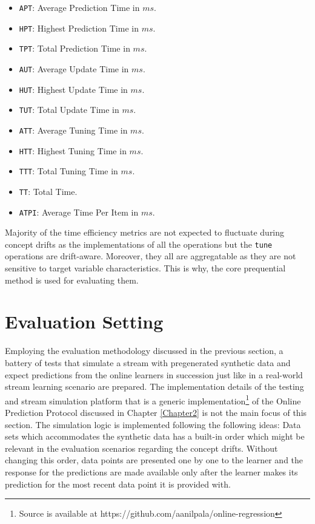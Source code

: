 \begin{itemize}
\item \texttt{APT}: Average Prediction Time in $ms$.
\item \texttt{HPT}: Highest Prediction Time in $ms$.
\item \texttt{TPT}: Total Prediction Time in $ms$.
\item \texttt{AUT}: Average Update Time in $ms$.
\item \texttt{HUT}: Highest Update Time in $ms$.
\item \texttt{TUT}: Total Update Time in $ms$.
\item \texttt{ATT}: Average Tuning Time in $ms$.
\item \texttt{HTT}: Highest Tuning Time in $ms$.
\item \texttt{TTT}: Total Tuning Time in $ms$.
\item \texttt{TT}: Total Time.
\item \texttt{ATPI}: Average Time Per Item in $ms$.
\end{itemize}

Majority of the time efficiency metrics are not expected to fluctuate during concept drifts as the implementations of all the operations but the \texttt{tune} operations are drift-aware. Moreover, they all are aggregatable as they are not sensitive to target variable characteristics. This is why, the core prequential method is used for evaluating them.

\section{Evaluation Setting}

Employing the evaluation methodology discussed in the previous section, a battery of tests that simulate a stream with pregenerated synthetic data and expect predictions from the online learners in succession just like in a real-world stream learning scenario are prepared. The implementation details of the testing and stream simulation platform that is a generic implementation\footnote{Source is available at https://github.com/aanilpala/online-regression} of the Online Prediction Protocol discussed in Chapter \ref{Chapter2} is not the main focus of this section. The simulation logic is implemented following the following ideas:
Data sets which accommodates the synthetic data has a built-in order which might be relevant in the evaluation scenarios regarding the concept drifts. Without changing this order, data points are presented one by one to the learner and the response for the predictions are made available only after the learner makes its prediction for the most recent data point it is provided with. 
%
%

